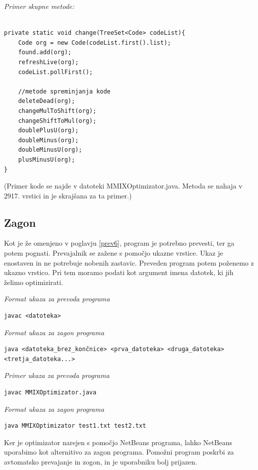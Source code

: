 \documentclass[a4paper, 12pt]{book}
\begin{document}
\noindent
{\it Primer skupne metode:}
\begin{Verbatim}[baselinestretch=1]

private static void change(TreeSet<Code> codeList){
	Code org = new Code(codeList.first().list);
	found.add(org);
	refreshLive(org);
	codeList.pollFirst();

	//metode spreminjanja kode
	deleteDead(org);
	changeMulToShift(org);
	changeShiftToMul(org);
	doublePlusU(org);
	doubleMinus(org);
	doubleMinusU(org);
	plusMinusU(org);
}
\end{Verbatim}
%
\noindent
{\small (Primer kode se najde v datoteki MMIXOptimizator.java. Metoda se nahaja v 2917. vrstici in je skrajšana za ta primer.)}


\subsection{Zagon}

Kot je že omenjeno v poglavju \ref{prev6}, program je potrebno prevesti, ter ga potem pognati. Prevajalnik se zažene s pomočjo ukazne vrstice. Ukaz je enostaven in ne potrebuje nobenih zastavic. Preveden program potem poženemo z ukazno vrstico. Pri tem moramo podati kot argument imena datotek, ki jih želimo optimizirati.

\medskip
	
\noindent
{\it Format ukaza za prevoda programa}
\begin{Verbatim}[baselinestretch=1]
	javac <datoteka>
\end{Verbatim}

\medskip

\noindent
{\it Format ukaza za zagon programa}
\begin{Verbatim}[baselinestretch=1]
java <datoteka_brez_končnice> <prva_datoteka> <druga_datoteka> <tretja_datoteka...>
\end{Verbatim}

\medskip

\noindent
{\it Primer ukaza za prevoda programa}
\begin{Verbatim}[baselinestretch=1]
javac MMIXOptimizator.java
\end{Verbatim}

\medskip

\noindent
{\it Format ukaza za zagon programa}
\begin{Verbatim}[baselinestretch=1]
java MMIXOptimizator test1.txt test2.txt
\end{Verbatim}

Ker je optimizator narejen s pomočjo NetBeans programa, lahko NetBeans uporabimo kot alternitivo za zagon programa. Pomožni program poskrbi za avtomatsko prevajanje in zogon, in je uporabniku bolj prijazen.  
\end{document}
